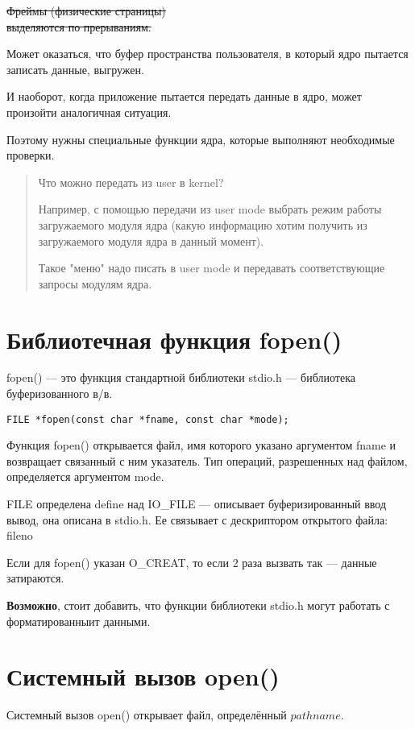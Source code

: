 \sout{Фреймы (физические страницы) \\ выделяются по прерываниям.}

Может оказаться, что буфер пространства пользователя, в который ядро пытается записать данные, выгружен.

И наоборот, когда приложение пытается передать данные в ядро, может произойти аналогичная ситуация.

Поэтому нужны специальные функции ядра, которые выполняют необходимые проверки.

\begin{quote}
Что можно передать из user в kernel?

Например, с помощью передачи из user mode выбрать режим работы загружаемого модуля ядра (какую информацию хотим получить из загружаемого модуля ядра в данный момент).

Такое "меню" надо писать в user mode и передавать соответствующие запросы модулям ядра.
\end{quote}

\section{Библиотечная функция fopen()}

fopen() — это функция стандартной библиотеки stdio.h --- библиотека буферизованного в/в.
\begin{lstlisting}
FILE *fopen(const char *fname, const char *mode);
\end{lstlisting}

Функция fopen() открывается файл, имя которого указано аргументом fname и возвращает связанный с ним указатель. Тип операций, разрешенных над файлом, определяется аргументом mode.

FILE определена define над IO\_FILE --- описывает буферизированный ввод вывод, она описана в stdio.h. Ее связывает с дескриптором открытого файла: fileno

Если для fopen() указан O\_CREAT, то если 2 раза вызвать так --- данные затираются.

\textbf{Возможно}, стоит добавить, что функции библиотеки stdio.h могут работать с форматированныит данными.

\section{Системный вызов open()}
Системный вызов open() открывает файл, определённый $pathname$.

